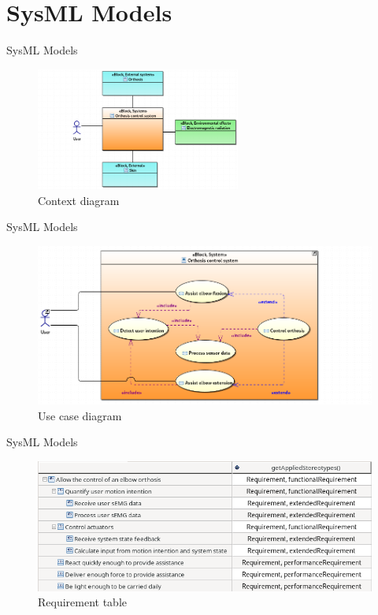 \documentclass[aspectratio=169]{beamer}
\begin{document}
\section{SysML Models}
\begin{frame}{SysML Models}
\begin{figure}[htbp]
  \centering
  \includegraphics[width=0.6\textwidth]{context.png}
  \caption{Context diagram}
  \label{fig:context_diagram}
\end{figure}
\end{frame}
\begin{frame}{SysML Models}
\begin{figure}[htbp]
  \centering
  \includegraphics[width=\textwidth]{use_case.png}
  \caption{Use case diagram}
  \label{fig:use_case_diagram}
\end{figure}
\end{frame}
\begin{frame}{SysML Models}
\begin{figure}[htbp]
  \centering
  \includegraphics[width=\textwidth]{requirement.png}
  \caption{Requirement table}
  \label{fig:requirements_table}
\end{figure}
\end{frame}
\end{document}
